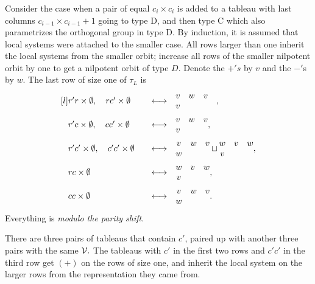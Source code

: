 \documentclass[11pt ,reqno]{amsart}
\begin{document}
\subsubsection{} Consider the case when a pair of equal
$c_{i}\times c_{i}$ is added to a tableau with last columns
$c_{i-1}\times c_{i-1}+1$ going to type D,
and then type C which also parametrizes the orthogonal
group in type D. By induction, it is assumed that local
systems were attached to the smaller case. All rows larger
than one inherit the local systems from the smaller orbit; increase
all rows of the smaller nilpotent orbit by one to get a nilpotent
orbit of type $D.$  Denote the $+'s$ by $v$ and the $-'$s by $w.$
The last row of size one of $\tau_L$ is 
$$
\begin{aligned}[l]
&\mat r' r\emat\times\mat\emptyset \emat,\quad \mat rc'\emat\times\mat\emptyset \emat
\quad&\longleftrightarrow\quad &\mat v&w&v&\\ v&\emat,\\
&\mat r' c\emat\times\mat\emptyset \emat,\quad \mat cc'\emat\times\mat\emptyset \emat
\quad&\longleftrightarrow\quad &\mat v&w&v\\ v\emat,\\
&\mat r' c'\emat\times\mat\emptyset \emat,\quad \mat c'c'\emat\times\mat\emptyset \emat
\quad&\longleftrightarrow\quad &\mat v&w&v\\ w\emat\sqcup \mat w&v&w\\v\emat,\\
&\mat rc\emat\times\mat\emptyset \emat\quad&\longleftrightarrow\quad &\mat w&v&w\\ v\emat,\\
&\mat cc\emat\times\mat\emptyset \emat\quad&\longleftrightarrow\quad &\mat v&w&v\\ w\emat.
\end{aligned}
$$
Everything is  \textit{modulo the parity shift}.

 There are three pairs of tableaus that contain $c'$,
 paired up with another three pairs with the same ${\mathcal V}.$ The tableaus
 with $c'$ in the first two rows and $c'c'$ in the third row get $(+)$
 on the rows of size one, and inherit the local  system on the larger
 rows from the representation they came from. 
\end{document}
